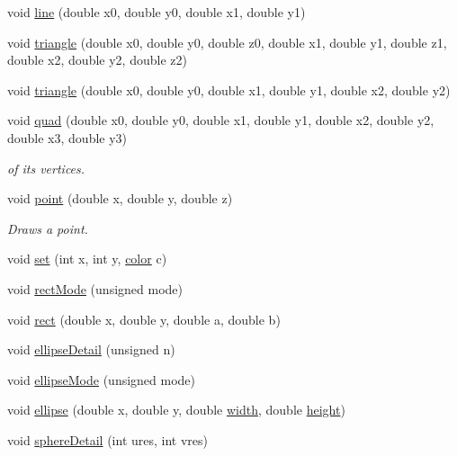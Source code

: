 \begin{DoxyCompactItemize}
void \hyperlink{namespacecprocessing_a199a958db5fcfb43dd16829e4342036f}{line} (double x0, double y0, double x1, double y1)
\item 
void \hyperlink{namespacecprocessing_af3cfb92d80a8efb01c014202a10f75f6}{triangle} (double x0, double y0, double z0, double x1, double y1, double z1, double x2, double y2, double z2)
\item 
void \hyperlink{namespacecprocessing_acaf82751989b6b6c5bf80f8f4f5a79a9}{triangle} (double x0, double y0, double x1, double y1, double x2, double y2)
\item 
void \hyperlink{namespacecprocessing_a0e705161c014a71dc629afb6237076cd}{quad} (double x0, double y0, double x1, double y1, double x2, double y2, double x3, double y3)
\begin{DoxyCompactList}\small\item\em of its vertices. \end{DoxyCompactList}\item 
void \hyperlink{namespacecprocessing_a2620e23fb7246c11aec8053b799ca391}{point} (double x, double y, double z)
\begin{DoxyCompactList}\small\item\em \-Draws a point. \end{DoxyCompactList}\item 
void \hyperlink{namespacecprocessing_a26595ae3ade8670ae1bf29a3637fc284}{set} (int x, int y, \hyperlink{classcprocessing_1_1color}{color} c)
\item 
void \hyperlink{namespacecprocessing_aa095baf1d8906e76226793542e9ebcc4}{rect\-Mode} (unsigned mode)
\item 
void \hyperlink{namespacecprocessing_ae674c2ae8ba8fdf8859addfe239c90be}{rect} (double x, double y, double a, double b)
\item 
void \hyperlink{namespacecprocessing_a4647a1b4d440f504e7d2b52866f58c3a}{ellipse\-Detail} (unsigned n)
\item 
void \hyperlink{namespacecprocessing_a8b3c72101215d89722a6fd09036c090e}{ellipse\-Mode} (unsigned mode)
\item 
void \hyperlink{namespacecprocessing_a9341930ee0fb1ee76a95e311b74e3065}{ellipse} (double x, double y, double \hyperlink{namespacecprocessing_a7af937eb8772235def57fcadd10fc82a}{width}, double \hyperlink{namespacecprocessing_ac392753eef02e2ad4ad84f5a076919be}{height})
\item 
void \hyperlink{namespacecprocessing_a21596477875fca056596a315117f9913}{sphere\-Detail} (int ures, int vres)
\item 

\end{DoxyCompactItemize}
